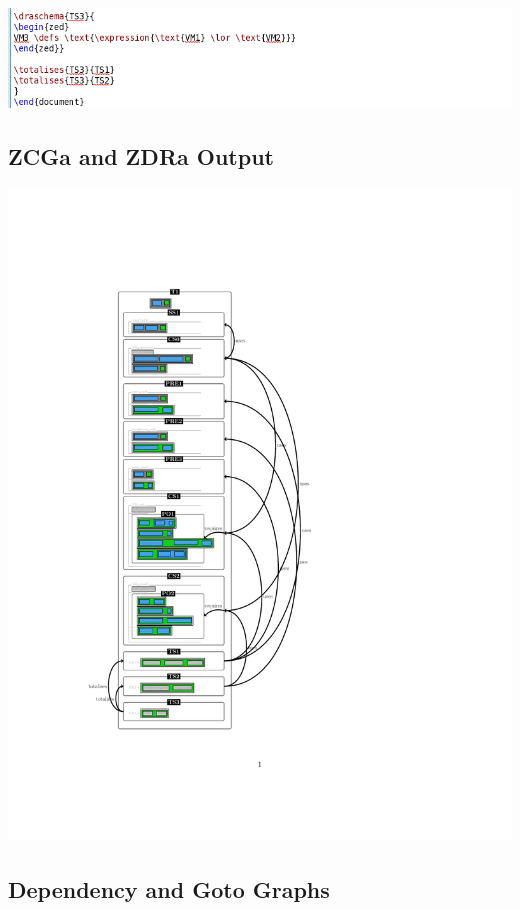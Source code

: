 \noindent \includegraphics[scale=0.5]{examples/vm/1n2imagec.png}



\subsection{ZCGa and ZDRa Output}
\label{app:vm1n2o}
\includegraphics[clip, trim=3cm 4cm 6cm 4.2cm]{examples/vm/1n2comp.pdf}

\subsection{Dependency and Goto Graphs}
\label{app:vm2.5}


